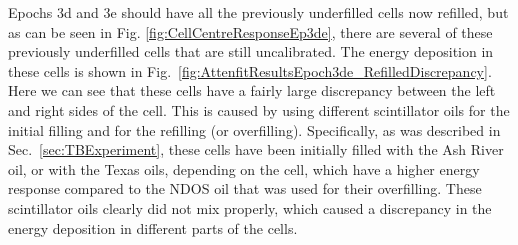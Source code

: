 Epochs 3d and 3e should have all the previously underfilled cells now refilled, but as can be seen in Fig. \ref{fig:CellCentreResponseEp3de}, there are several of these previously underfilled cells that are still uncalibrated. The energy deposition in these cells is shown in Fig.~\ref{fig:AttenfitResultsEpoch3de_RefilledDiscrepancy}. Here we can see that these cells have a fairly large discrepancy between the left and right sides of the cell. This is caused by using different scintillator oils for the initial filling and for the refilling (or overfilling). Specifically, as was described in Sec.~\ref{sec:TBExperiment}, these cells have been initially filled with the Ash River oil, or with the Texas oils, depending on the cell, which have a higher energy response compared to the \gls{NDOS} oil that was used for their overfilling. These scintillator oils clearly did not mix properly, which caused a discrepancy in the energy deposition in different parts of the cells.

